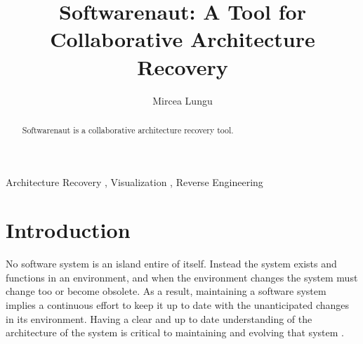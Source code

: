 \documentclass[preprint,12pt]{elsarticle}
\begin{document}
\begin{frontmatter}



\title{Softwarenaut: A Tool for Collaborative Architecture Recovery}


\author{Mircea Lungu}

\address{Software Composition Group\\University of Bern\\Switzerland}

\begin{abstract}
Softwarenaut is a collaborative architecture recovery tool.
\end{abstract}

\begin{keyword}
Architecture Recovery \sep
Visualization \sep
Reverse Engineering
\end{keyword}

\end{frontmatter}


\section{Introduction}
\label{sec:Introduction}

No software system is an island entire of itself. Instead the system exists and functions in an environment, and when the environment changes the system must change too or become obsolete\cite{lehman-softev}. As a result, maintaining a software system implies a continuous effort to keep it up to date with the unanticipated changes in its environment. Having a clear and up to date understanding of the architecture of the system is critical to maintaining and evolving that system \cite{Duca09c}.
\end{document}
